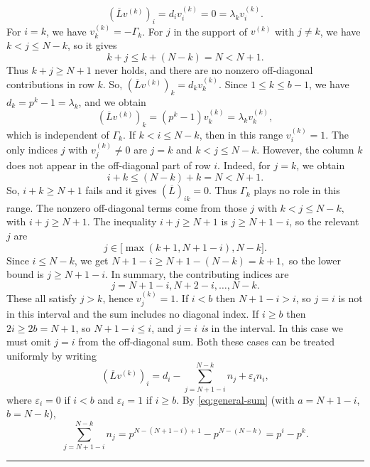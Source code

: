 \documentclass[12pt,twoside]{article}
\renewenvironment{proof}{{\noindent\bfseries Proof.}}{\qed}
\def\qed{\nolinebreak\hfill\rule{.2cm}{.2cm}\par\addvspace{.5cm}}
\begin{document}
\begin{proof}
	\[
	(\overline{L}v^{(k)})_i = d_i v^{(k)}_i = 0 = \lambda_k v^{(k)}_i.
	\]
	For $i=k$, we have $v^{(k)}_k=- \varGamma_k$. For $j$ in the support of $v^{(k)}$ with
	$j\ne k$, we have $k<j\le N-k$, so it gives
	\[
	k+j \le k+(N-k) = N < N+1.
	\]
	Thus $k+j\ge N+1$ never holds, and there are no nonzero off-diagonal
	contributions in row $k$. So, $(\overline{L}v^{(k)})_k = d_k v^{(k)}_k.$
	Since $1\le k\le b-1$, we have $d_k=p^k-1=\lambda_k$, and we obtain 
	\[
	(\overline{L}v^{(k)})_k = (p^k-1)v^{(k)}_k
	= \lambda_k v^{(k)}_k,
	\]
	which is independent of $ \varGamma_k$. If $k<i\le N-k$, then in this range $v^{(k)}_i=1$. The only indices $j$ with $v_j^{(k)}\ne 0$	are $j=k$ and $k<j\le N-k$. However, the column $k$ does not appear in the off-diagonal part of row $i$. 	Indeed, for $j=k$, we obtain
	\[
	i+k \le (N-k)+k = N < N+1.
	\]
	So, $i+k\ge N+1$ fails and it gives $(\overline{L})_{ik}=0$. Thus $ \varGamma_k$ plays
	no role in this range. The nonzero off-diagonal terms come from those
	$j$ with $k<j\le N-k, $ with $ i+j\ge N+1.$
	The inequality $i+j\ge N+1$ is $j\ge N+1-i$, so the relevant $j$ are
	\[
	j\in\bigl[\max(k+1,N+1-i), N-k\bigr].
	\]
	Since $i\le N-k$, we get $N+1-i \ge N+1-(N-k)=k+1,$ 	so the lower bound is $j\ge N+1-i$. In summary, the contributing
	indices are
	\[
	j = N+1-i,N+2-i,\dots,N-k.
	\]
	These all satisfy $j>k$, hence $v^{(k)}_j=1$. 	If $i<b$ then $N+1-i > i$, so $j=i$ is not in this interval and the
	sum includes no diagonal index. If $i\ge b$ then $2i\ge 2b=N+1$, so
	$N+1-i \le i$, and $j=i$ \emph{is} in the interval. In this case we
	must omit $j=i$ from the off-diagonal sum. Both these cases can be treated
	uniformly by writing
	\[
	(\overline{L}v^{(k)})_i
	= d_i - \sum_{j=N+1-i}^{N-k} n_j + \varepsilon_i n_i,
	\]
	where $\varepsilon_i=0$ if $i<b$ and $\varepsilon_i=1$ if $i\ge b$. By \eqref{eq:general-sum} (with $a=N+1-i$, $b=N-k$),
	\[
	\sum_{j=N+1-i}^{N-k} n_j
	= p^{N-(N+1-i)+1}-p^{N-(N-k)}
	= p^i-p^k.
	\]
	

\end{proof}
\end{document}
